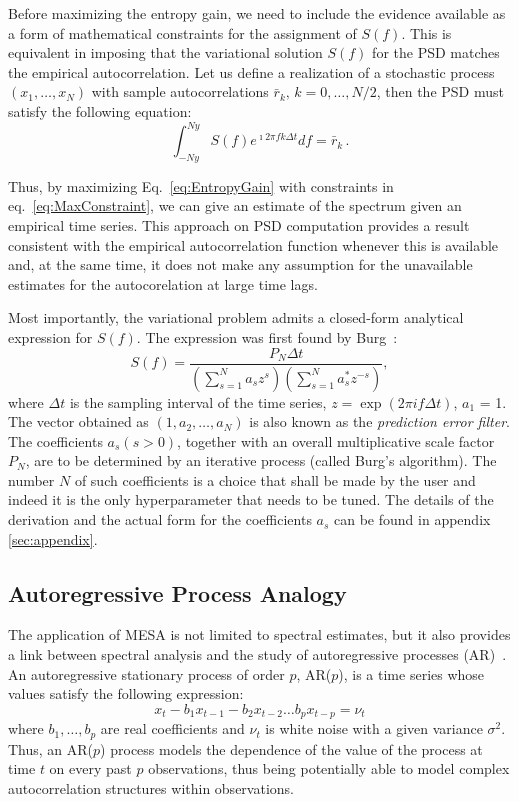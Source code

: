 \documentclass[twocolumn,showpacs,preprintnumbers,nofootinbib,prd,
superscriptaddress,10pt]{revtex4-1}
\begin{document}
Before maximizing the entropy gain, we need to include the evidence available as a form of mathematical constraints for the assignment of $S(f)$.
This is equivalent in imposing that the variational solution $S(f)$ for the PSD matches the empirical autocorrelation.
Let us define a realization of a stochastic process $(x_1,\ldots,x_N)$ with sample autocorrelations $\bar r_k,\,k=0,\ldots, N/2$, then the PSD must satisfy the following equation:
\begin{equation}\label{eq:MaxConstraint}
\int_{-Ny}^{Ny} S(f) e^{\imath 2 \pi f k \Delta t} df = \bar r_{k}\,.
\end{equation}

Thus, by maximizing Eq.~\eqref{eq:EntropyGain} with constraints in eq.~\eqref{eq:MaxConstraint}, we can give an estimate of the spectrum given an empirical time series.
This approach on PSD computation provides a result consistent with the empirical autocorrelation function whenever this is available and, at the same time, it does not make any assumption for the unavailable estimates for the autocorelation at large time lags.

Most importantly, the variational problem admits a closed-form analytical expression for $S(f)$.
The expression was first found by Burg~\cite{burg1975maximum}:
\begin{equation}\label{eq:MESApsd}
    S(f) = \frac{P_N \Delta t}{\left(\sum_{s=1}^N a_s z^s\right)\left(\sum_{s = 1}^N a^*_s z^{-s}\right)}, 
\end{equation}
where $\Delta t$ is the sampling interval of the time series, $z=\exp{(2\pi i f\Delta t)}$, $a_1$ = 1.
The vector obtained as $(1, a_2, \dots, a_N)$ is also known as the \textit{prediction error filter}.
The coefficients $a_s (s > 0)$, together with an overall multiplicative scale factor $P_N$, are to be determined by an iterative process (called Burg's algorithm). The number $N$ of such coefficients is a choice that shall be made by the user and indeed it is the only hyperparameter that needs to be tuned. The details of the derivation and the actual form for the coefficients $a_s$ can be found in appendix \ref{sec:appendix}.

\subsection{Autoregressive Process Analogy} \label{sec:autoregr}

The application of MESA is not limited to spectral estimates, but it also provides a link between spectral analysis and the study
of autoregressive processes (AR)~\cite{doi:10.1029/RG013i001p00183}.
An autoregressive stationary process of order $p$, AR($p$), is a time series whose values satisfy the following expression: 
\begin{equation} \label{eq:AR_p}
    x_t - b_1 x_{t-1} - b_2 x_{t-2} \dots b_p x_{t - p} = \nu_t
\end{equation}
where $b_1, \ldots, b_p$ are real coefficients and $\nu_t$ is white noise with a given variance $\sigma^2$.
Thus, an AR($p$) process models the dependence of the value of the process at time $t$ on every past $p$ observations, 
thus being potentially able to model complex autocorrelation structures within observations.
\end{document}
